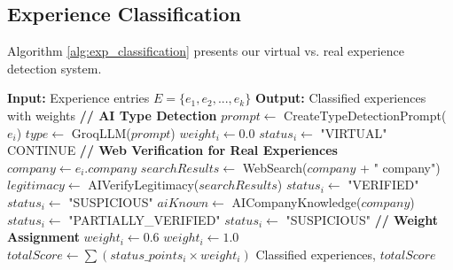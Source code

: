 \documentclass[journal]{IEEEtran}
\begin{document}
\subsection{Experience Classification}

\noindent{}

\vspace{0.3cm}

Algorithm \ref{alg:exp_classification} presents our virtual vs. real experience detection system.

\begin{algorithm}
\caption{Virtual vs. Real Experience Classification}
\label{alg:exp_classification}
\begin{algorithmic}[1]
\STATE \textbf{Input:} Experience entries $E = \{e_1, e_2, ..., e_k\}$
\STATE \textbf{Output:} Classified experiences with weights
\STATE
{}
    \STATE \textbf{// AI Type Detection}
    \STATE $prompt \leftarrow$ CreateTypeDetectionPrompt($e_i$)
    \STATE $type \leftarrow$ GroqLLM($prompt$)
    \STATE
        \STATE $weight_i \leftarrow 0.0$
        \STATE $status_i \leftarrow$ "VIRTUAL"
        \STATE CONTINUE
    \ENDIF
    \STATE
    \STATE \textbf{// Web Verification for Real Experiences}
    \STATE $company \leftarrow e_i.company$
    \STATE $searchResults \leftarrow$ WebSearch($company$ + " company")
    \STATE
        \STATE $legitimacy \leftarrow$ AIVerifyLegitimacy($searchResults$)
            \STATE $status_i \leftarrow$ "VERIFIED"
        \ELSE
            \STATE $status_i \leftarrow$ "SUSPICIOUS"
        \ENDIF
    \ELSE
        \STATE $aiKnown \leftarrow$ AICompanyKnowledge($company$)
            \STATE $status_i \leftarrow$ "PARTIALLY\_VERIFIED"
        \ELSE
            \STATE $status_i \leftarrow$ "SUSPICIOUS"
        \ENDIF
    \ENDIF
    \STATE
    \STATE \textbf{// Weight Assignment}
        \STATE $weight_i \leftarrow 0.6$
    \ELSE
        \STATE $weight_i \leftarrow 1.0$
    \ENDIF
\ENDFOR
\STATE
\STATE $totalScore \leftarrow \sum (status\_points_i \times weight_i)$
\RETURN Classified experiences, $totalScore$
\end{algorithmic}
\end{algorithm}
\end{document}
